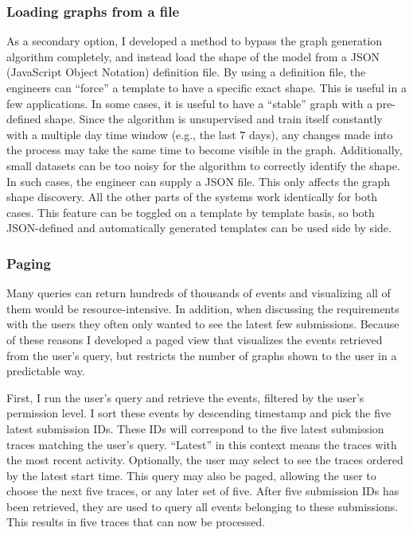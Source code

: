 \subsubsection{Loading graphs from a file}
\label{sec:jsonfile}

As a secondary option, I developed a method to bypass the graph generation algorithm completely, and instead load the shape of the model from a JSON (JavaScript Object Notation) definition file.
By using a definition file, the engineers can ``force'' a template to have a specific exact shape.
This is useful in a few applications.
In some cases, it is useful to have a ``stable'' graph with a pre-defined shape.
Since the algorithm is unsupervised and train itself constantly with a multiple day time window (e.g., the last 7 days), any changes made into the process may take the same time to become visible in the graph.
Additionally, small datasets can be too noisy for the algorithm to correctly identify the shape.
In such cases, the engineer can supply a JSON file.
This only affects the graph shape discovery. 
All the other parts of the systems work identically for both cases.
This feature can be toggled on a template by template basis, so both JSON-defined and automatically generated templates can be used side by side.

\subsubsection{Paging}
\label{sec:paging}

Many queries can return hundreds of thousands of events and visualizing all of them would be resource-intensive.
In addition, when discussing the requirements with the users they often only wanted to see the latest few submissions.
Because of these reasons I developed a paged view that visualizes the events retrieved from the user's query, but restricts the number of graphs shown to the user in a predictable way.

First, I run the user's query and retrieve the events, filtered by the user's permission level.
I sort these events by descending timestamp and pick the five latest submission IDs.
These IDs will correspond to the five latest submission traces matching the user's query.
``Latest'' in this context means the traces with the most recent activity.
Optionally, the user may select to see the traces ordered by the latest start time.
This query may also be paged, allowing the user to choose the next five traces, or any later set of five.
After five submission IDs has been retrieved, they are used to query all events belonging to these submissions. This results in five traces that can now be processed.

